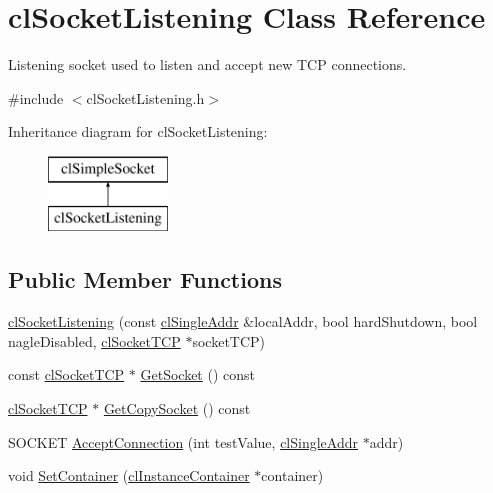 \hypertarget{classcl_socket_listening}{
\section{clSocketListening Class Reference}
\label{classcl_socket_listening}
}


Listening socket used to listen and accept new TCP connections.  




{\ttfamily \#include $<$clSocketListening.h$>$}

Inheritance diagram for clSocketListening:\begin{figure}[H]
\begin{center}
\leavevmode
\includegraphics[height=2.000000cm]{classcl_socket_listening}
\end{center}
\end{figure}
\subsection*{Public Member Functions}
\begin{DoxyCompactItemize}
\item 
\hyperlink{classcl_socket_listening_a0c88e836c8ec320b513d21f962e62f23}{clSocketListening} (const \hyperlink{classcl_single_addr}{clSingleAddr} \&localAddr, bool hardShutdown, bool nagleDisabled, \hyperlink{classcl_socket_t_c_p}{clSocketTCP} $\ast$socketTCP)
\item 
const \hyperlink{classcl_socket_t_c_p}{clSocketTCP} $\ast$ \hyperlink{classcl_socket_listening_a6e234847294989cfedd8fb44c626688b}{GetSocket} () const 
\item 
\hyperlink{classcl_socket_t_c_p}{clSocketTCP} $\ast$ \hyperlink{classcl_socket_listening_a912ccb81bf37beb7265ce360afe457b7}{GetCopySocket} () const 
\item 
SOCKET \hyperlink{classcl_socket_listening_a677d44d9ad6162368179aeb5d8eb9d91}{AcceptConnection} (int testValue, \hyperlink{classcl_single_addr}{clSingleAddr} $\ast$addr)
\item 
void \hyperlink{classcl_socket_listening_a060b530ee10d0b050f64d4c125801696}{SetContainer} (\hyperlink{classcl_instance_container}{clInstanceContainer} $\ast$container)
\end{DoxyCompactItemize}
